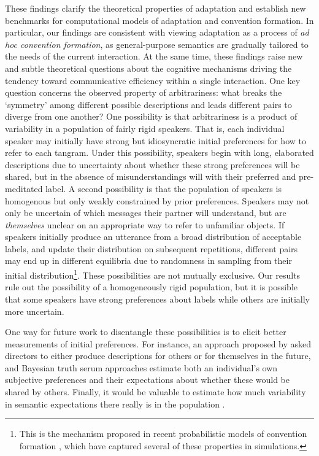 \documentclass[alpha-refs]{wiley-article}
\begin{document}
These findings clarify the theoretical properties of adaptation and establish new benchmarks for computational models of adaptation and convention formation.
In particular, our findings are consistent with viewing adaptation as a process of \emph{ad hoc convention formation}, as general-purpose semantics are gradually tailored to the needs of the current interaction.
At the same time, these findings raise new and subtle theoretical questions about the cognitive mechanisms driving the tendency toward communicative efficiency within a single interaction.
One key question concerns the observed property of arbitrariness: what breaks the `symmetry' among different possible descriptions and leads different pairs to diverge from one another?
One possibility is that arbitrariness is a product of variability in a population of fairly rigid speakers.
That is, each individual speaker may initially have strong but idiosyncratic initial preferences for how to refer to each tangram. 
Under this possibility, speakers begin with long, elaborated descriptions due to uncertainty about whether these strong preferences will be shared, but in the absence of misunderstandings will  with their preferred and pre-meditated label.
A second possibility is that the population of speakers is homogenous but only weakly constrained by prior preferences. 
Speakers may not only be uncertain of which messages their partner will understand, but are \emph{themselves} unclear on an appropriate way to refer to unfamiliar objects.
If speakers initially produce an utterance from a broad distribution of acceptable labels, and update their distribution on subsequent repetitions, different pairs may end up in different equilibria due to randomness in sampling from their initial distribution\footnote{This is the mechanism proposed in recent probabilistic models of convention formation \citep{smith_learning_2013,hawkins_convention-formation_2017,Brochagen17}, which have captured several of these properties in simulations.}. 
These possibilities are not mutually exclusive.
Our results rule out the possibility of a homogeneously rigid population, but it is possible that some speakers have strong preferences about labels while others are initially more uncertain. 

One way for future work to disentangle these possibilities is to elicit better measurements of initial preferences.
For instance, an approach proposed by \cite{FussellKrauss89_IntendedAudienceCommonGround} asked directors to either produce descriptions for others or for themselves in the future, and Bayesian truth serum approaches \citep{prelec2004bayesian} estimate both an individual's own subjective preferences and their expectations about whether these would be shared by others.
Finally, it would be valuable to estimate how much variability in semantic expectations there really is in the population \citep{FurnasEtAl87_VocabularyProblem,kleinschmidt2019structure}.
\end{document}

